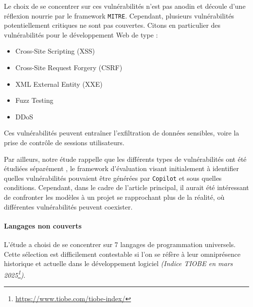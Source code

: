                     Le choix de se concentrer sur ces vulnérabilités n'est pas anodin et découle
                    d'une réflexion nourrie par le framework \texttt{MITRE}. Cependant,
                    plusieurs vulnérabilités potentiellement critiques ne sont pas couvertes.
                    Citons en particulier des vulnérabilités pour le développement Web de type :

                    \begin{itemize}
                        \item Cross-Site Scripting (XSS)
                        \item Cross-Site Request Forgery (CSRF)
                        \item XML External Entity (XXE)
                        \item Fuzz Testing
                        \item DDoS
                    \end{itemize}

                    Ces vulnérabilités peuvent entraîner l'exfiltration de données sensibles,
                    voire la prise de contrôle de sessions utilisateurs.

                    \begin{tcolorbox}[colback=linkborder_Color!5!white,colframe=linkborder_Color!75!black]
                        Par ailleurs, notre étude rappelle que les différents types de
                        vulnérabilités ont
                        été étudiées séparément \cite{mainArticle} \cite{38metrics}, le
                        framework d'évaluation visant initialement à identifier quelles
                        vulnérabilités pouvaient être générées par \texttt{Copilot} et sous
                        quelles conditions. Cependant, dans le cadre de l'article principal, il
                        aurait été intéressant de confronter les modèles à un projet se rapprochant
                        plus de la réalité, où différentes vulnérabilités peuvent coexister.
                    \end{tcolorbox}



                \paragraph*{Langages non couverts}
                    L'étude a choisi de se concentrer sur 7 langages de programmation
                    universels. Cette sélection est difficilement contestable si l'on se réfère
                    à leur omniprésence historique et actuelle dans le développement logiciel \textit{(Indice TIOBE en mars 2025\footnote{\url{https://www.tiobe.com/tiobe-index/}})}.

